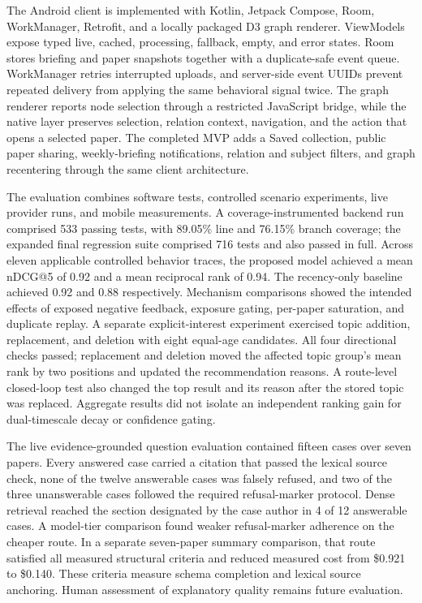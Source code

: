 \begin{digest}
The Android client is implemented with Kotlin, Jetpack Compose, Room, WorkManager, Retrofit, and a locally packaged D3 graph renderer. ViewModels expose typed live, cached, processing, fallback, empty, and error states. Room stores briefing and paper snapshots together with a duplicate-safe event queue. WorkManager retries interrupted uploads, and server-side event UUIDs prevent repeated delivery from applying the same behavioral signal twice. The graph renderer reports node selection through a restricted JavaScript bridge, while the native layer preserves selection, relation context, navigation, and the action that opens a selected paper. The completed MVP adds a Saved collection, public paper sharing, weekly-briefing notifications, relation and subject filters, and graph recentering through the same client architecture.

The evaluation combines software tests, controlled scenario experiments, live provider runs, and mobile measurements. A coverage-instrumented backend run comprised 533 passing tests, with 89.05\% line and 76.15\% branch coverage; the expanded final regression suite comprised 716 tests and also passed in full. Across eleven applicable controlled behavior traces, the proposed model achieved a mean nDCG@5 of 0.92 and a mean reciprocal rank of 0.94. The recency-only baseline achieved 0.92 and 0.88 respectively. Mechanism comparisons showed the intended effects of exposed negative feedback, exposure gating, per-paper saturation, and duplicate replay. A separate explicit-interest experiment exercised topic addition, replacement, and deletion with eight equal-age candidates. All four directional checks passed; replacement and deletion moved the affected topic group's mean rank by two positions and updated the recommendation reasons. A route-level closed-loop test also changed the top result and its reason after the stored topic was replaced. Aggregate results did not isolate an independent ranking gain for dual-timescale decay or confidence gating.

The live evidence-grounded question evaluation contained fifteen cases over seven papers. Every answered case carried a citation that passed the lexical source check, none of the twelve answerable cases was falsely refused, and two of the three unanswerable cases followed the required refusal-marker protocol. Dense retrieval reached the section designated by the case author in 4 of 12 answerable cases. A model-tier comparison found weaker refusal-marker adherence on the cheaper route. In a separate seven-paper summary comparison, that route satisfied all measured structural criteria and reduced measured cost from \$0.921 to \$0.140. These criteria measure schema completion and lexical source anchoring. Human assessment of explanatory quality remains future evaluation.


\end{digest}
